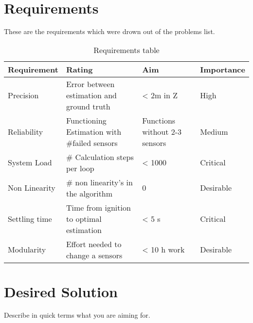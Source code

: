  \cite{}
 
\section{Requirements}
These are the requirements which were drown out of the problems list.
 
 \begin{table}[h]
\centering
\begin{tabular}{|l|l|l|l|}
\hline
\bf{Requirement}   & \bf{Rating} & \bf{Aim} & \bf{Importance} \\ \hline
Precision     & Error between estimation and ground truth  & < 2m in Z & High  \\ \hline
Reliability   & Functioning Estimation with \#failed sensors & Functions without 2-3 sensors & Medium \\ \hline
System Load   & \# Calculation steps per loop & < 1000 & Critical \\ \hline
Non Linearity & \# non linearity's in the algorithm  & 0 &  Desirable\\ \hline
Settling time & Time from ignition to optimal estimation  & < 5 s &  Critical\\ \hline
Modularity    & Effort needed to change a sensors & < 10 h work &  Desirable\\ \hline

\end{tabular}
\caption{Requirements table}
\label{tab:Requirements}
\end{table}
 
\section{Desired Solution}
 
Describe in quick terms what you are aiming for.
